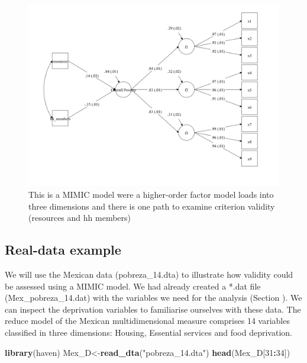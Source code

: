 \documentclass[]{book}
\newenvironment{Shaded}{\begin{snugshade}}{\end{snugshade}}
\newcommand{\DecValTok}[1]{\textcolor[rgb]{0.00,0.00,0.81}{#1}}
\newcommand{\KeywordTok}[1]{\textcolor[rgb]{0.13,0.29,0.53}{\textbf{#1}}}
\newcommand{\NormalTok}[1]{#1}
\newcommand{\OperatorTok}[1]{\textcolor[rgb]{0.81,0.36,0.00}{\textbf{#1}}}
\newcommand{\StringTok}[1]{\textcolor[rgb]{0.31,0.60,0.02}{#1}}
\begin{document}
\begin{figure}
\includegraphics[width=\textwidth]{val_sem_1} \caption{This is a MIMIC model were a higher-order factor model loads into three dimensions and there is one path to examine criterion validity (resources and hh members)}\label{fig:valsem1}
\end{figure}

\hypertarget{real-data-example-1}{%
\subsection{Real-data example}\label{real-data-example-1}}

We will use the Mexican data (pobreza\_14.dta) to illustrate how validity could be assessed using a MIMIC model. We had already created a *.dat file (Mex\_pobreza\_14.dat) with the variables we need for the analysis (Section ). We can inspect the deprivation variables to familiarise ourselves with these data. The reduce model of the Mexican multidimensional measure comprises 14 variables classified in three dimensions: Housing, Essential services and food deprivation.

\begin{Shaded}
\begin{Highlighting}[]
\KeywordTok{library}\NormalTok{(haven)}
\NormalTok{Mex_D<-}\KeywordTok{read_dta}\NormalTok{(}\StringTok{"pobreza_14.dta"}\NormalTok{)}
\KeywordTok{head}\NormalTok{(Mex_D[}\DecValTok{31}\OperatorTok{:}\DecValTok{34}\NormalTok{])}
\end{Highlighting}
\end{Shaded}
\end{document}
